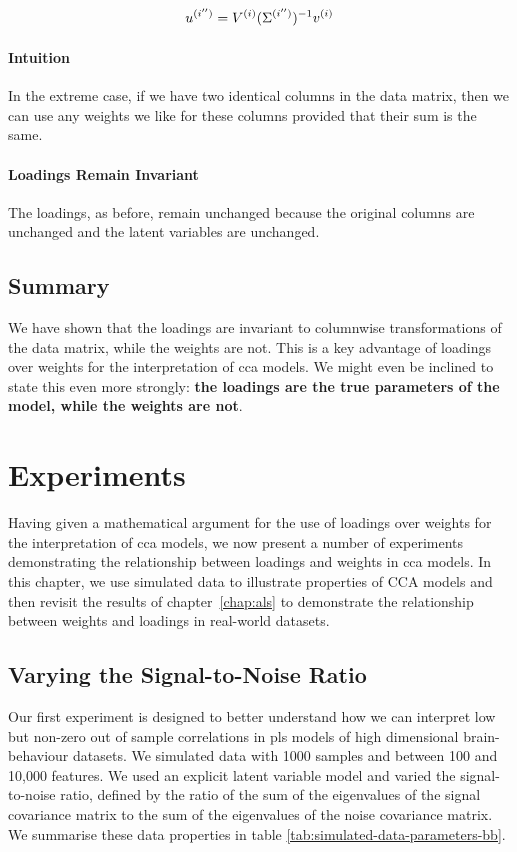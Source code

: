 \begin{align}
    u^{(i'')} = V^{(i)}(\Sigma^{(i'')})^{-1}v^{(i)} \label{eq:weights_change}
\end{align}

\paragraph{Intuition}
In the extreme case, if we have two identical columns in the data matrix, then we can use any weights we like for these columns provided that their sum is the same.

\paragraph{Loadings Remain Invariant}
The loadings, as before, remain unchanged because the original columns are unchanged and the latent variables are unchanged.

\subsection{Summary}

We have shown that the \gls{loadings} are invariant to columnwise transformations of the data matrix, while the weights are not.
This is a key advantage of \gls{loadings} over weights for the interpretation of \acrshort{cca} models.
We might even be inclined to state this even more strongly: \textbf{the loadings are the true parameters of the model, while the weights are not}.


\section{Experiments}

Having given a mathematical argument for the use of \gls{loadings} over weights for the interpretation of \acrshort{cca} models, we now present a number of experiments demonstrating the relationship between loadings and weights in \acrshort{cca} models.
In this chapter, we use simulated data to illustrate properties of CCA models and then revisit the results of chapter~\ref{chap:als} to demonstrate the relationship between \gls{weights} and \gls{loadings} in real-world datasets.

\subsection{Varying the Signal-to-Noise Ratio}
Our first experiment is designed to better understand how we can interpret low but non-zero out of sample correlations in \acrshort{pls} models of high dimensional brain-behaviour datasets.
We simulated data with 1000 samples and between 100 and 10,000 features.
We used an explicit latent variable model and varied the signal-to-noise ratio, defined by the ratio of the sum of the eigenvalues of the signal covariance matrix to the sum of the eigenvalues of the noise covariance matrix.
We summarise these data properties in table \ref{tab:simulated-data-parameters-bb}.

